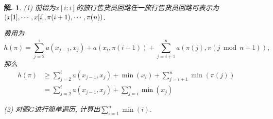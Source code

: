 \documentclass[a4paper,oneside,12pt]{ctexart}
\theoremstyle{plain}
\theoremstyle{nonumberplain}
\newtheorem{solution}{解.}
\theoremstyle{nonumberplain}
\begin{document}
    \begin{solution}
        (1) 前缀为$x[i:i]$的旅行售货员回路任一旅行售货员回路可表示为$(x[1],\cdots,x[i],\\\pi(i+1),\cdots,\pi(n))$.

        费用为
        \begin{equation*}
            h(\pi)=\sum_{j=2}^ia(x_{j-1},x_j)+a(x_i,\pi(i+1))+\sum_{j=i+1}^na(\pi(j),\pi(j\bmod n+1)),
        \end{equation*}
        那么 
        \begin{align*}
            h(\pi)&\geqslant \sum_{j=2}^ia(x_{j-1},x_j)+\min(x_i)+\sum_{j=i+1}^n\min(\pi(j))\\
            &=\sum_{j=2}^ia(x_{j-1},x_j)+\sum_{j=i}^n\min(x_j)
        \end{align*}

        (2) 对图$G$进行简单遍历, 计算出$\sum_{i=1}^n\min(i)$.
    \end{solution}
\end{document}
